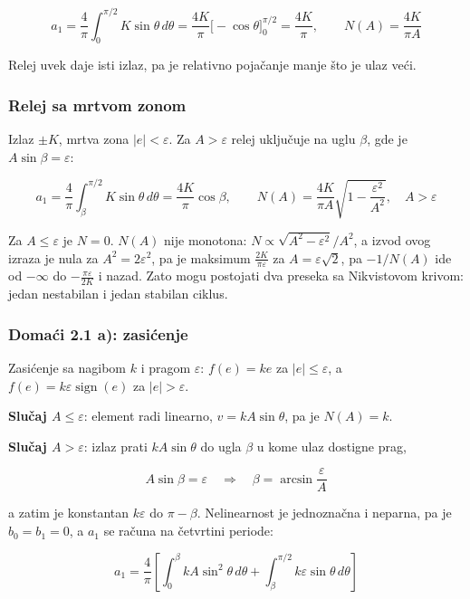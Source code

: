 \documentclass[11pt,a4paper,parskip=half,headsepline,numbers=noenddot]{scrartcl}
\begin{document}
\[a_1 = \frac{4}{\pi}\int_0^{\pi/2} K\sin\theta\,d\theta = \frac{4K}{\pi}\big[-\cos\theta\big]_0^{\pi/2} = \frac{4K}{\pi}, \qquad N(A) = \frac{4K}{\pi A}\]

Relej uvek daje isti izlaz, pa je relativno pojačanje manje što je ulaz veći.

\subsubsection{Relej sa mrtvom zonom}

Izlaz \(\pm K\), mrtva zona \(|e| < \varepsilon\). Za \(A > \varepsilon\) relej uključuje na uglu \(\beta\), gde je \(A\sin\beta = \varepsilon\):

\[a_1 = \frac{4}{\pi}\int_\beta^{\pi/2} K\sin\theta\,d\theta = \frac{4K}{\pi}\cos\beta, \qquad N(A) = \frac{4K}{\pi A}\sqrt{1 - \frac{\varepsilon^2}{A^2}}, \quad A > \varepsilon\]

Za \(A \le \varepsilon\) je \(N = 0\). \(N(A)\) nije monotona: \(N \propto \sqrt{A^2 - \varepsilon^2}/A^2\), a izvod ovog izraza je nula za \(A^2 = 2\varepsilon^2\), pa je maksimum \(\frac{2K}{\pi\varepsilon}\) za \(A = \varepsilon\sqrt2\), pa \(-1/N(A)\) ide od \(-\infty\) do \(-\frac{\pi\varepsilon}{2K}\) i nazad. Zato mogu postojati dva preseka sa Nikvistovom krivom: jedan nestabilan i jedan stabilan ciklus.

\subsubsection{Domaći 2.1 a): zasićenje}

Zasićenje sa nagibom \(k\) i pragom \(\varepsilon\): \(f(e) = ke\) za \(|e| \le \varepsilon\), a \(f(e) = k\varepsilon\operatorname{sign}(e)\) za \(|e| > \varepsilon\).

\textbf{Slučaj \(A \le \varepsilon\)}: element radi linearno, \(v = kA\sin\theta\), pa je \(N(A) = k\).

\textbf{Slučaj \(A > \varepsilon\)}: izlaz prati \(kA\sin\theta\) do ugla \(\beta\) u kome ulaz dostigne prag,

\[A\sin\beta = \varepsilon \quad\Rightarrow\quad \beta = \arcsin\frac{\varepsilon}{A}\]

a zatim je konstantan \(k\varepsilon\) do \(\pi - \beta\). Nelinearnost je jednoznačna i neparna, pa je \(b_0 = b_1 = 0\), a \(a_1\) se računa na četvrtini periode:

\[a_1 = \frac{4}{\pi}\left[\int_0^\beta kA\sin^2\theta\,d\theta + \int_\beta^{\pi/2} k\varepsilon\sin\theta\,d\theta\right]\]
\end{document}
